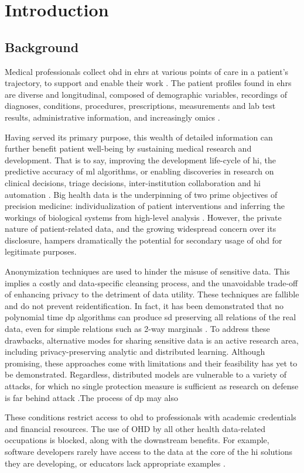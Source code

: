 \glsresetall
\section{Introduction}
    \subsection{Background}
        Medical professionals collect \gls{ohd} in \glspl{ehr} at various points of care in a patient’s trajectory, to support and enable their work \cite{Cowie_2016}. The patient profiles found in \glspl{ehr} are diverse and longitudinal, composed of demographic variables, recordings of diagnoses, conditions, procedures, prescriptions, measurements and lab test results, administrative information, and increasingly omics \cite{Ohdsi2020-vf}.\par
        Having served its primary purpose, this wealth of detailed information can further benefit patient well-being by sustaining medical research and development. That is to say, improving the development life-cycle of \gls{hi}, the predictive accuracy of \gls{ml} algorithms, or enabling discoveries in research on clinical decisions, triage decisions, inter-institution collaboration and \gls{hi} automation \cite{Rudin_2020}. Big health data is the underpinning of two prime objectives of precision medicine: individualization of patient interventions and inferring the workings of biological systems from high-level analysis \cite{Capobianco2020}. However, the private nature of patient-related data, and the growing widespread concern over its disclosure, hampers dramatically the potential for secondary usage of \gls{ohd} for legitimate purposes.\par
        
        Anonymization techniques are used to hinder the misuse of sensitive data. This implies a costly and data-specific cleansing process, and the unavoidable trade-off of enhancing privacy to the detriment of data utility.  These techniques are fallible and do not prevent reidentification. In fact, it has been demonstrated that no polynomial time \gls{dp} algorithms can produce \gls{sd} preserving all relations of the real data, even for simple relations such as 2-way marginals \cite{Ullman2011}. To address these drawbacks, alternative modes for sharing sensitive data is an active research area, including privacy-preserving analytic and distributed learning. Although promising, these approaches come with limitations and their feasibility has yet to be demonstrated. Regardless, distributed models are vulnerable to a variety of attacks, for which no single protection measure is sufficient as research on defense is far behind attack \cite{enthoven2020overview, Gao2020}.The process of \gls{dp} may also \par
        These conditions restrict access to \gls{ohd} to professionals with academic credentials and financial resources. The use of OHD by all other health data-related occupations is blocked, along with the downstream benefits. For example, software developers rarely have access to the data at the core of the \gls{hi} solutions they are developing, or educators lack appropriate examples \cite{laderas_teaching_2018}.
        
